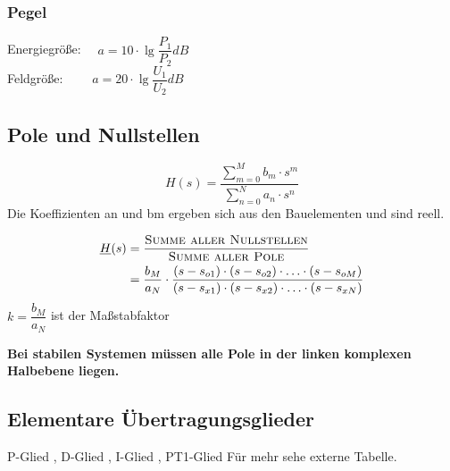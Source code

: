 \subsubsection{Pegel}
    \begin{mdframed}[style=exercise]
        Energiegröße: $\quad a = 10\cdot \lg\dfrac{P_1}{P_2}dB $\\
        Feldgröße: $\qquad a = 20\cdot \lg\dfrac{U_1}{U_2}dB $
    \end{mdframed}

\subsection{Pole und Nullstellen}
\[
    H(s)=\frac{\sum_{m=0}^{M} b_{m} \cdot s^{m}}{\sum_{n=0}^{N} a_{n} \cdot s^{n}}
\]
Die Koeffizienten an und bm ergeben sich aus den Bauelementen und sind reell.
\begin{mdframed}[style=exercise]
    \begin{align*}
        \underline{H}(s) &= \frac{\textsc{Summe aller Nullstellen}}{\textsc{Summe aller Pole}}\\
        &=\frac{b_{M}}{a_{N}} \cdot \frac{\left(s-s_{o 1}\right) \cdot\left(s-s_{o
        2}\right) \cdot \ldots \cdot\left(s-s_{o M}\right)}{\left(s-s_{x 1}\right)
        \cdot\left(s-s_{x 2}\right) \cdot \ldots \cdot\left(s-s_{x N}\right)}
    \end{align*}
    $k=\dfrac{b_M}{a_N}$ ist der Maßstabfaktor
\end{mdframed}
\textbf{Bei stabilen Systemen müssen alle Pole in der linken komplexen Halbebene liegen.}

\subsection{Elementare Übertragungsglieder}
\footnotesize
    P-Glied , D-Glied , I-Glied , PT1-Glied
\normalsize
Für mehr sehe externe Tabelle.

